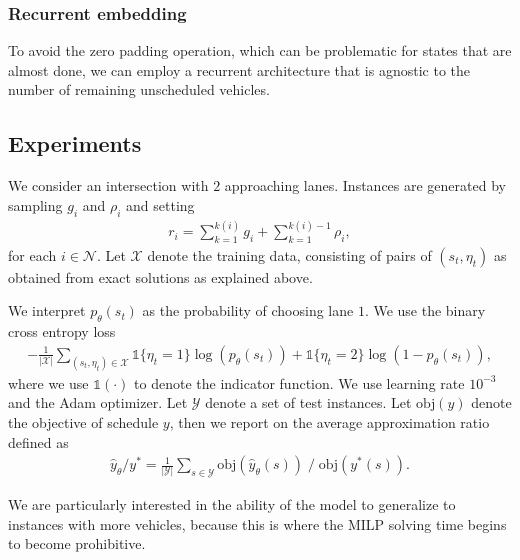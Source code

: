\documentclass[a4paper]{article}
\theoremstyle{definition}
\theoremstyle{plain}
\begin{document}
\subsubsection*{Recurrent embedding}

To avoid the zero padding operation, which can be problematic for states that
are almost done, we can employ a recurrent architecture that is agnostic to the
number of remaining unscheduled vehicles.

\subsection*{Experiments}

We consider an intersection with $2$ approaching lanes.
Instances are generated by sampling $g_{i}$ and $\rho_{i}$ and setting
\begin{align*}
  r_{i} = \sum_{k=1}^{k(i)} g_{i} + \sum_{k=1}^{k(i) - 1} \rho_{i} ,
\end{align*}
for each $i \in \mathcal{N}$. Let $\mathcal{X}$ denote the
training data, consisting of pairs of $(s_{t}, \eta_{t})$ as obtained from exact
solutions as explained above.


%
We interpret $p_{\theta}(s_{t})$ as the probability of choosing lane $1$.
We use the binary cross entropy loss
\begin{align*}
  - \frac{1}{|\mathcal{X}|} \sum_{(s_{t}, \eta_{t}) \in \mathcal{X}} \mathds{1}\{\eta_{t} = 1\} \log(p_{\theta}(s_{t})) + \mathds{1}\{\eta_{t} = 2\} \log(1 - p_{\theta}(s_{t})) ,
\end{align*}
where we use $\mathds{1}(\cdot)$ to denote the indicator function.
We use learning rate $10^{-3}$ and the Adam optimizer.
%
Let $\mathcal{Y}$ denote a set of test instances.
Let $\text{obj}(y)$ denote the objective of schedule $y$, then
we report on the average approximation ratio defined as
\begin{align*}
\hat{y}_{\theta} / y^{*} = \frac{1}{|\mathcal{Y}|} \sum_{s \in \mathcal{Y}} \text{obj}(\hat{y}_{\theta}(s)) \; / \; \text{obj}(y^{*}(s)) .
\end{align*}

We are particularly interested in the ability of the model to generalize to
instances with more vehicles, because this is where the MILP solving time
begins to become prohibitive.

\end{document}
